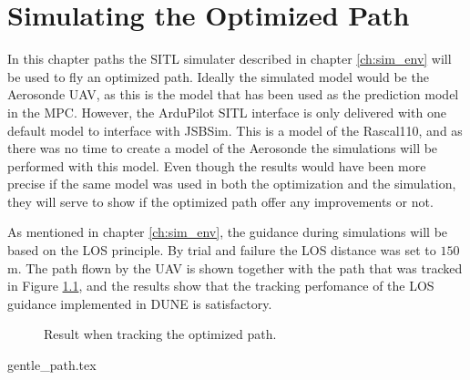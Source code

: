 \chapter{Simulating the Optimized Path}

In this chapter paths the SITL simulater described in chapter \ref{ch:sim_env} will be used to fly an optimized path. Ideally the simulated model would be the Aerosonde UAV, as this is the model that has been used as the prediction model in the MPC. However, the ArduPilot SITL interface is only delivered with one default model to interface with JSBSim. This is a model of the Rascal110, and as there was no time to create a model of the Aerosonde the simulations will be performed with this model. Even though the results would have been more precise if the same model was used in both the optimization and the simulation, they will serve to show if the optimized path offer any improvements or not.

As mentioned in chapter \ref{ch:sim_env}, the guidance during simulations will be based on the LOS principle. By trial and failure the LOS distance was set to $150$m. The path flown by the UAV is shown together with the path that was tracked in Figure \ref{fig:sim_tracking}, and the results show that the tracking perfomance of the LOS guidance implemented in DUNE is satisfactory.

\begin{figure}
	\caption{Result when tracking the optimized path.}
	\label{fig:sim_tracking}
\end{figure}

{gentle_path.tex}